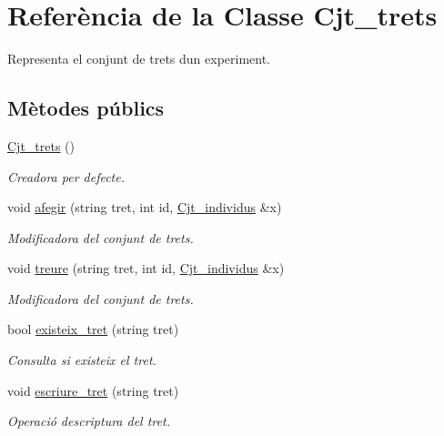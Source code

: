 \hypertarget{class_cjt__trets}{}\section{Referència de la Classe Cjt\+\_\+trets}
\label{class_cjt__trets}


Representa el conjunt de trets d\textquotesingle{}un experiment.  


\subsection*{Mètodes públics}
\begin{DoxyCompactItemize}
\item 
\hyperlink{class_cjt__trets_a0f3d29b433ebfa6d9680e1ee0f39279b}{Cjt\+\_\+trets} ()
\begin{DoxyCompactList}\small\item\em Creadora per defecte. \end{DoxyCompactList}\item 
void \hyperlink{class_cjt__trets_ad315f780dfe22f6730ee9ce9aa2b25d7}{afegir} (string tret, int id, \hyperlink{class_cjt__individus}{Cjt\+\_\+individus} \&x)
\begin{DoxyCompactList}\small\item\em Modificadora del conjunt de trets. \end{DoxyCompactList}\item 
void \hyperlink{class_cjt__trets_ae4152db728b8c78d6e56856e0e88de33}{treure} (string tret, int id, \hyperlink{class_cjt__individus}{Cjt\+\_\+individus} \&x)
\begin{DoxyCompactList}\small\item\em Modificadora del conjunt de trets. \end{DoxyCompactList}\item 
bool \hyperlink{class_cjt__trets_a6da10e61a25071a25eca708f61a1e33d}{existeix\+\_\+tret} (string tret)
\begin{DoxyCompactList}\small\item\em Consulta si existeix el tret. \end{DoxyCompactList}\item 
void \hyperlink{class_cjt__trets_ad53ad0f5574d551fdbc8f665323a1db7}{escriure\+\_\+tret} (string tret)
\begin{DoxyCompactList}\small\item\em Operació d\textquotesingle{}escriptura del tret. \end{DoxyCompactList}\end{DoxyCompactItemize}
